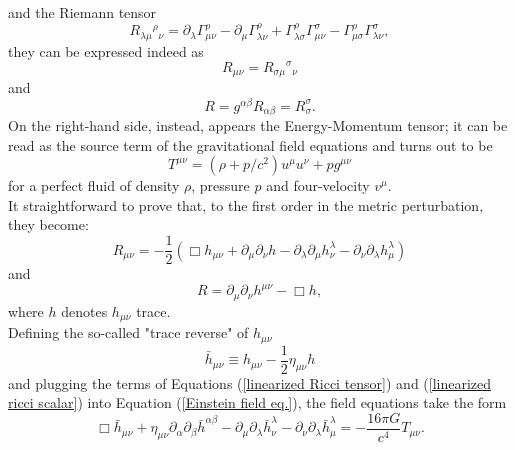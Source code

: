 and the Riemann tensor
\begin{equation}\label{Riemmann tensor def}
    R_{\lambda\mu}{}^{\rho}{}_{\nu}=\partial_\lambda \Gamma_{\mu\nu}^\rho-\partial_\mu \Gamma_{\lambda\nu}^\rho+\Gamma_{\lambda\sigma}^\rho \Gamma_{\mu\nu}^\sigma-\Gamma_{\mu\sigma}^\rho \Gamma_{\lambda\nu}^\sigma,
\end{equation}
they can be expressed indeed as 
\begin{equation}\label{Ricci tensor def}
    R_{\mu\nu}=R_{\sigma\mu}{}^{\sigma}{}_{\nu}
\end{equation}
and 
\begin{equation}\label{Ricci scalar def} R=g^{\alpha\beta}R_{\alpha\beta}=R_\sigma^\sigma.
\end{equation}
On the right-hand side, instead, appears the Energy-Momentum tensor; it can be read as the source term of the gravitational field equations and turns out to be
\begin{equation}\label{Energy-Momentum tensor def}
    T^{\mu\nu}=(\rho+p/c^2)u^\mu u^\nu+pg^{\mu\nu}
\end{equation}
for a perfect fluid of density $\rho$, pressure $p$ and four-velocity $v^\mu$.\\It straightforward to prove that, to the first order in the metric perturbation, they become:
\begin{equation}\label{linearized Ricci tensor}
    R_{\mu \nu}=-\frac{1}{2}(\Box h_{\mu \nu}+\partial_\mu \partial_\nu h-\partial_\lambda\partial_\mu h_\nu^\lambda-\partial_\nu\partial_\lambda h_\mu^\lambda)
\end{equation}
 and
\begin{equation}\label{linearized ricci scalar}
    R=\partial_\mu \partial_\nu h^{\mu\nu}-\Box h,
\end{equation}
where $h$ denotes $h_{\mu \nu}$ trace.\\Defining the so-called "trace reverse" of $h_{\mu\nu}$
\begin{equation}\label{trace reverse definition}
    \bar{h}_{\mu\nu}\equiv h_{\mu\nu}-\frac{1}{2}\eta_{\mu\nu} h
\end{equation}
and plugging the terms of Equations (\ref{linearized Ricci tensor}) and (\ref{linearized ricci scalar}) into Equation (\ref{Einstein field eq.}), the field equations take the form
\begin{equation}\label{linearized Einstein Eq. LONG}
    \Box \bar{h}_{\mu\nu} + \eta_{\mu\nu}\partial_\alpha\partial_\beta \bar{h}^{\alpha\beta}-\partial_\mu\partial_\lambda \bar{h}^\lambda_\nu-\partial_\nu\partial_\lambda \bar{h}^\lambda_\mu=-\frac{16\pi G}{c^4}T_{\mu\nu}.
\end{equation}
